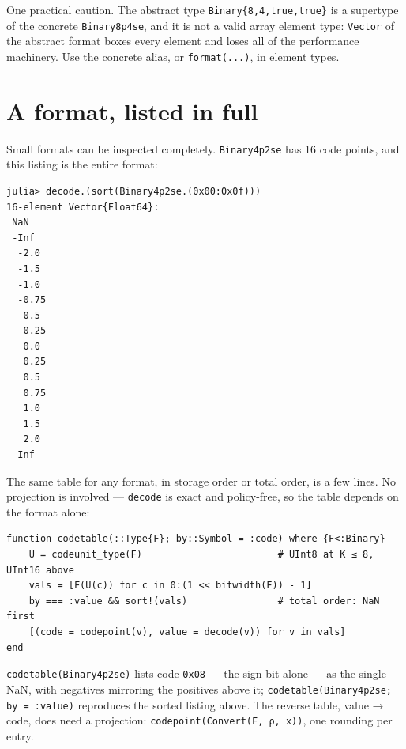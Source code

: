 One practical caution. The abstract type \texttt{Binary\{8,4,true,true\}} is a supertype of the concrete \texttt{Binary8p4se}, and it is not a valid array element type: \texttt{Vector} of the abstract format boxes every element and loses all of the performance machinery. Use the concrete alias, or \texttt{format(...)}, in element types.



\section{A format, listed in full}



\label{981248173416556099}{}


Small formats can be inspected completely. \texttt{Binary4p2se} has 16 code points, and this listing is the entire format:




\nopagebreak[4]
\begin{verbatim}
julia> decode.(sort(Binary4p2se.(0x00:0x0f)))
16-element Vector{Float64}:
 NaN
 -Inf
  -2.0
  -1.5
  -1.0
  -0.75
  -0.5
  -0.25
   0.0
   0.25
   0.5
   0.75
   1.0
   1.5
   2.0
  Inf
\end{verbatim}



The same table for any format, in storage order or total order, is a few lines. No projection is involved — \texttt{decode} is exact and policy-free, so the table depends on the format alone:




\nopagebreak[4]
\begin{verbatim}
function codetable(::Type{F}; by::Symbol = :code) where {F<:Binary}
    U = codeunit_type(F)                        # UInt8 at K ≤ 8, UInt16 above
    vals = [F(U(c)) for c in 0:(1 << bitwidth(F)) - 1]
    by === :value && sort!(vals)                # total order: NaN first
    [(code = codepoint(v), value = decode(v)) for v in vals]
end
\end{verbatim}



\texttt{codetable(Binary4p2se)} lists code \texttt{0x08} — the sign bit alone — as the single NaN, with negatives mirroring the positives above it; \texttt{codetable(\allowbreak{}Binary4p2se; by = :value)} reproduces the sorted listing above. The reverse table, value → code, does need a projection: \texttt{codepoint(\allowbreak{}Convert(\allowbreak{}F, ρ, x))}, one rounding per entry.



